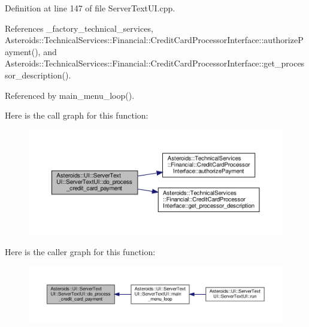 Definition at line 147 of file Server\+Text\+U\+I.\+cpp.



References \+\_\+factory\+\_\+technical\+\_\+services, Asteroids\+::\+Technical\+Services\+::\+Financial\+::\+Credit\+Card\+Processor\+Interface\+::authorize\+Payment(), and Asteroids\+::\+Technical\+Services\+::\+Financial\+::\+Credit\+Card\+Processor\+Interface\+::get\+\_\+processor\+\_\+description().



Referenced by main\+\_\+menu\+\_\+loop().

Here is the call graph for this function\+:\nopagebreak
\begin{figure}[H]
\begin{center}
\leavevmode
\includegraphics[width=350pt]{classAsteroids_1_1UI_1_1ServerTextUI_1_1ServerTextUI_a6713eb173fef32a2fc96932b96ce2dea_cgraph}
\end{center}
\end{figure}
Here is the caller graph for this function\+:\nopagebreak
\begin{figure}[H]
\begin{center}
\leavevmode
\includegraphics[width=350pt]{classAsteroids_1_1UI_1_1ServerTextUI_1_1ServerTextUI_a6713eb173fef32a2fc96932b96ce2dea_icgraph}
\end{center}
\end{figure}
\mbox{\label{classAsteroids_1_1UI_1_1ServerTextUI_1_1ServerTextUI_af85d5a35efcb8c75fe7b5419da0d6f93}} 
